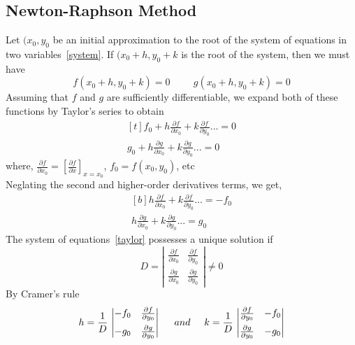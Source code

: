 \documentclass[aima203_lecturenotes_ku.tex]{subfiles}
\begin{document}
\subsection{Newton-Raphson Method}
Let $(x_0,y_0$ be an initial approximation to the root of the system of equations in two variables~\ref{system}. If $(x_0+h, y_0+k$ is the root of the system, then we must have
\begin{equation*}
  f(x_0+h,y_0+k) = 0 \hspace{1cm} g(x_0+h,y_0+k) = 0
\end{equation*}
Assuming that $f$ and $g$ are sufficiently differentiable, we expand both of these functions by Taylor's series to obtain
\begin{equation*}
  \begin{gathered}[t]
    f_0 +h\frac{\partial f}{\partial x_0} + k\frac{\partial f}{\partial y_0}... = 0 \\
    g_0 +h\frac{\partial g}{\partial x_0} + k\frac{\partial g}{\partial y_0}... = 0
  \end{gathered}
\end{equation*}
where, \hspace{5mm} $\displaystyle \frac{\partial f}{\partial x_0} = \left [\frac{\partial f}{\partial x} \right ] _{x=x_0}$, $f_0 = f(x_0,y_0)$, etc \\[1mm]
Neglating the second and higher-order derivatives terms, we get,
\begin{equation}
  \label{taylor}
  \begin{gathered}[b]
    h\frac{\partial f}{\partial x_0} + k\frac{\partial f}{\partial y_0}... = -f_0 \\
     h\frac{\partial g}{\partial x_0} + k\frac{\partial g}{\partial y_0}... = g_0
  \end{gathered}
\end{equation}
The system of equations~\ref{taylor} possesses a unique solution if
$$ D =
\left \vert \begin{matrix}
  \frac{\partial f}{\partial x_0}  & \frac{\partial f}{\partial y_0} \\[2mm]
  \frac{\partial g}{\partial x_0}  & \frac{\partial g}{\partial y_0}
\end{matrix} \right \vert  \neq 0
$$
By Cramer's rule
\begin{equation}
  h= \frac{1}{D}\, \left \vert \begin{matrix}
  -f_0  & \frac{\partial f}{\partial y_0} \\[2mm]
  -g_0  & \frac{\partial g}{\partial y_0}
\end{matrix} \right \vert \hspace{5mm} and \hspace{5mm} k= \frac{1}{D}\, \left \vert \begin{matrix}
  \frac{\partial f}{\partial y_0} & -f_0  \\[2mm]
 \frac{\partial g}{\partial y_0} &  -g_0
\end{matrix} \right \vert
\end{equation}
\end{document}
